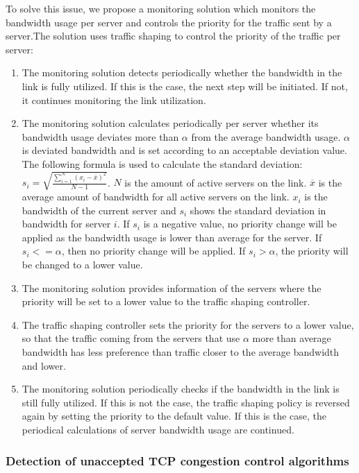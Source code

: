 \documentclass{article}
\begin{document}
To solve this issue, we propose a monitoring solution which monitors the bandwidth usage per server and controls the priority for the traffic sent by a server.The solution uses traffic shaping to control the priority of the traffic per server:
\begin{enumerate}
	\item The monitoring solution detects periodically whether the bandwidth in the link is fully utilized. If this is the case, the next step will be initiated. If not, it continues monitoring the link utilization.
	\item The monitoring solution calculates periodically per server whether its bandwidth usage deviates more than $\alpha$ from the average bandwidth usage. $\alpha$ is deviated bandwidth and is set according to an acceptable deviation value. The following formula is used to calculate the standard deviation: $s_{i} = \sqrt{\frac{\sum_{i=1}^N (x_i - \overline{x})^2}{N-1} }$. $N$ is the amount of active servers on the link. $\overline{x}$ is the average amount of bandwidth for all active servers on the link. $x_i$ is the bandwidth of the current server and $s_{i}$ shows the standard deviation in bandwidth for server $i$. If $s_{i}$ is a negative value, no priority change will be applied as the bandwidth usage is lower than average for the server. If $s_{i} <= \alpha$, then no priority change will be applied. If $s_{i} > \alpha$, the priority will be changed to a lower value.
	\item The monitoring solution provides information of the servers where the priority will be set to a lower value to the traffic shaping controller.
	\item The traffic shaping controller sets the priority for the servers to a lower value, so that the traffic coming from the servers that use $\alpha$ more than average bandwidth has less preference than traffic closer to the average bandwidth and lower.
	\item The monitoring solution periodically checks if the bandwidth in the link is still fully utilized. If this is not the case, the traffic shaping policy is reversed again by setting the priority to the default value. If this is the case, the periodical calculations of server bandwidth usage are continued.
\end{enumerate}

\subsubsection{Detection of unaccepted TCP congestion control algorithms}
\end{document}
